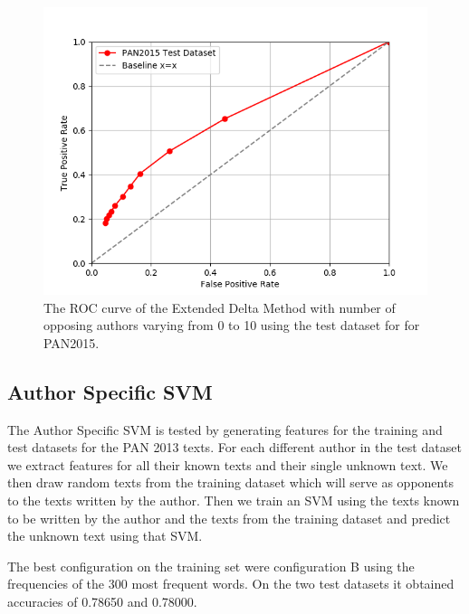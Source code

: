 \begin{figure}
    \centering
    \includegraphics[width=.7\textwidth]{./pictures/extended_delta_method_roc.png}
    \caption{The ROC curve of the Extended Delta Method with number of opposing
    authors varying from 0 to 10 using the test dataset for for PAN2015.}
    \label{fig:extended_delta_method_roc}
\end{figure}

\subsection{Author Specific SVM}
The Author Specific SVM is tested by generating features for the training and
test datasets for the PAN 2013 texts. For each different author in the test
dataset we extract features for all their known texts and their single unknown
text. We then draw random texts from the training dataset which will serve as
opponents to the texts written by the author. Then we train an SVM using the
texts known to be written by the author and the texts from the training dataset
and predict the unknown text using that SVM.

The best configuration on the training set were configuration B using the
frequencies of the 300 most frequent words. On the two test datasets it obtained
accuracies of 0.78650 and 0.78000.

